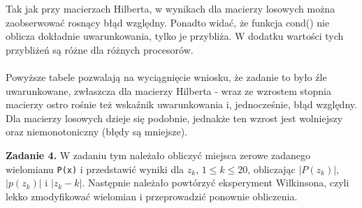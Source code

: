\documentclass[15pt, a4paper]{article}
\begin{document}
\vspace{0.5cm}

\noindent Tak jak przy macierzach Hilberta, w wynikach dla macierzy losowych można zaobserwować rosnący błąd względny. Ponadto widać, że funkcja cond() nie oblicza dokładnie uwarunkowania, tylko je przybliża. W dodatku wartości tych przybliżeń są różne dla różnych procesorów. \\\\
\noindent Powyższe tabele pozwalają na wyciągnięcie wniosku, że zadanie to było źle uwarunkowane, zwłaszcza dla macierzy Hilberta - wraz ze wzrostem stopnia macierzy ostro rośnie też wskaźnik uwarunkowania i, jednocześnie, błąd względny. Dla macierzy losowych dzieje się podobnie, jednakże ten wzrost jest wolniejszy oraz niemonotoniczny (błędy są mniejsze).

\vspace{0.5cm}

\pagebreak

\noindent\hrulefill


\vspace{0.5cm}

\noindent\textbf{Zadanie 4.} W zadaniu tym należało obliczyć miejsca zerowe zadanego wielomianu \verb|P(x)| i przedstawić wyniki dla \( z_k \), \( 1 \leq k \leq 20 \), obliczając \( |P(z_k)| \), \( |p(z_k)| \) i \( |z_k - k| \). Następnie należało powtórzyć eksperyment Wilkinsona, czyli lekko zmodyfikować wielomian i przeprowadzić ponownie obliczenia.

\vspace{0.5cm}
\end{document}
